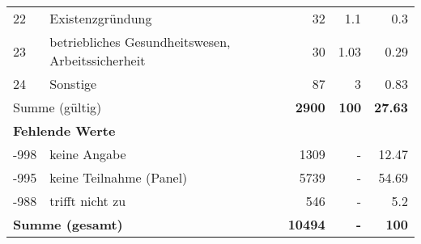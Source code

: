 \begin{longtable}{lXrrr}
        22 & \multicolumn{1}{X}{Existenzgründung} & %
          \num{32} &
          \num[round-mode=places,round-precision=2]{1,1} &
          \num[round-mode=places,round-precision=2]{0,3} \\

        23 & \multicolumn{1}{X}{betriebliches Gesundheitswesen, Arbeitssicherheit} & %
          \num{30} &
          \num[round-mode=places,round-precision=2]{1,03} &
          \num[round-mode=places,round-precision=2]{0,29} \\

        24 & \multicolumn{1}{X}{Sonstige} & %
          \num{87} &
          \num[round-mode=places,round-precision=2]{3} &
          \num[round-mode=places,round-precision=2]{0,83} \\

     \midrule
     \multicolumn{2}{l}{Summe (gültig)} &
       \textbf{\num{2900}} &
     \textbf{100} &
       \textbf{\num[round-mode=places,round-precision=2]{27,63}} \\
     \multicolumn{5}{l}{\textbf{Fehlende Werte}}\\
       -998 &
       keine Angabe &
         \num{1309} &
        - &
         \num[round-mode=places,round-precision=2]{12,47} \\
       -995 &
       keine Teilnahme (Panel) &
         \num{5739} &
        - &
         \num[round-mode=places,round-precision=2]{54,69} \\
       -988 &
       trifft nicht zu &
         \num{546} &
        - &
         \num[round-mode=places,round-precision=2]{5,2} \\
     \midrule
     \multicolumn{2}{l}{\textbf{Summe (gesamt)}} &
          \textbf{\num{10494}} &
        \textbf{-} &
        \textbf{100} \\
     \bottomrule
     \end{longtable}
     
